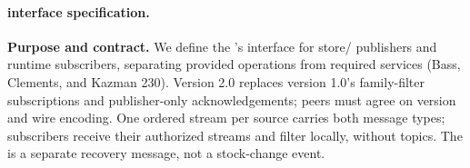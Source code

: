 \begingroup
\small
\setlength{\parskip}{3pt plus 1pt}
\setlength{\emergencystretch}{3em}
\paragraph{\IEP interface specification.}\label{sec:iep}
\textbf{Purpose and contract.} We define the \CFE's interface for store/\DC
publishers and runtime subscribers, separating provided operations from required
services (Bass, Clements, and Kazman 230). Version 2.0 replaces version 1.0's
family-filter subscriptions and publisher-only acknowledgements; peers must agree
on version and wire encoding. One ordered stream per source carries both message
types; subscribers receive their authorized streams and filter locally, without topics.
The \StoreSnapshot is a separate recovery message, not a stock-change event.

